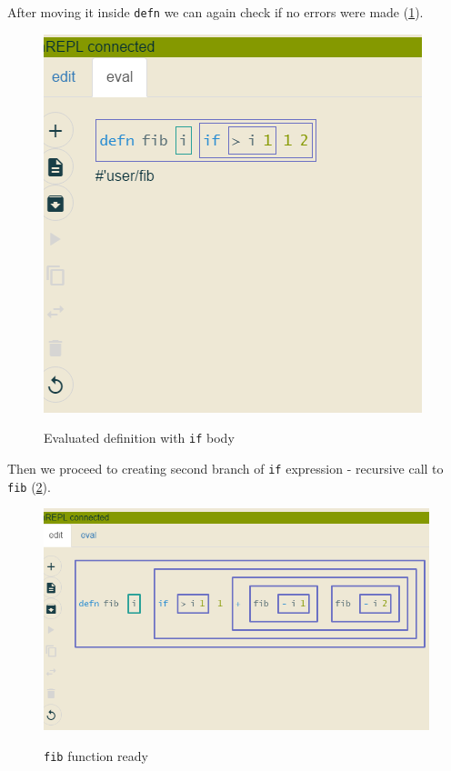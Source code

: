 \documentclass[11pt]{scrartcl}
\begin{document}
After moving it inside \lstinline{defn} we can again check if no errors were
made (\ref{j-if-check}).

\begin{figure}[hbt]
  \includegraphics[scale=0.3]{img/j-if-check}
  \label{j-if-check}
  \caption{Evaluated definition with \lstinline{if} body}
\end{figure}

Then we proceed to creating second branch of \lstinline{if} expression -
recursive call to \lstinline{fib} (\ref{j-fib-rec}).

\begin{figure}[hbt]
  \includegraphics[scale=0.3]{img/j-fib-rec}
  \label{j-fib-rec}
  \caption{\lstinline{fib} function ready}
\end{figure}
\end{document}
